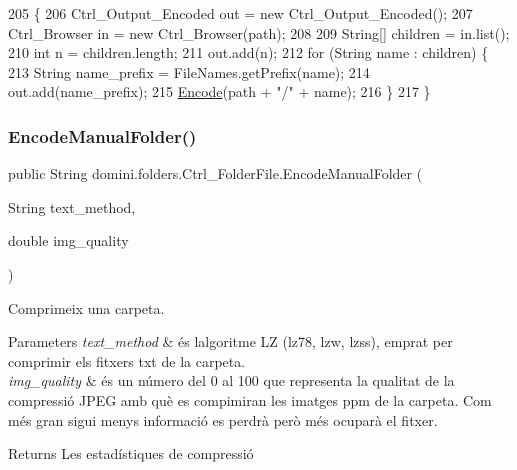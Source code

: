 \begin{DoxyCode}
205                                            \{
206         Ctrl\_Output\_Encoded out = \textcolor{keyword}{new} Ctrl\_Output\_Encoded();
207         Ctrl\_Browser in = \textcolor{keyword}{new} Ctrl\_Browser(path);
208 
209         String[] children = in.list();
210         \textcolor{keywordtype}{int} n = children.length;
211         out.add(n);
212         \textcolor{keywordflow}{for} (String name : children) \{
213             String name\_prefix = FileNames.getPrefix(name);
214             out.add(name\_prefix);
215             \hyperlink{classdomini_1_1folders_1_1Ctrl__FolderFile_a7c47fd5127ae6f713a4fa7f75002a6f6}{Encode}(path + \textcolor{stringliteral}{"/"} + name);
216         \}
217     \}
\end{DoxyCode}
\mbox{\label{classdomini_1_1folders_1_1Ctrl__FolderFile_a8cb5f1a979d5882dd244d69806d5b237}} 
\subsubsection{\texorpdfstring{Encode\+Manual\+Folder()}{EncodeManualFolder()}}
{\footnotesize\ttfamily public String domini.\+folders.\+Ctrl\+\_\+\+Folder\+File.\+Encode\+Manual\+Folder (\begin{DoxyParamCaption}\item[{String}]{text\+\_\+method,  }\item[{double}]{img\+\_\+quality }\end{DoxyParamCaption})\hspace{0.3cm}{\ttfamily [inline]}}



Comprimeix una carpeta. 


\begin{DoxyParams}{Parameters}
{\em text\+\_\+method} & és l\textquotesingle{}algoritme LZ (lz78, lzw, lzss), emprat per comprimir els fitxers txt de la carpeta. \\
\hline
{\em img\+\_\+quality} & és un número del 0 al 100 que representa la qualitat de la compressió J\+P\+EG amb què es compimiran les imatges ppm de la carpeta. Com més gran sigui menys informació es perdrà però més ocuparà el fitxer. \\
\hline
\end{DoxyParams}
\begin{DoxyReturn}{Returns}
Les estadístiques de compressió 
\end{DoxyReturn}

